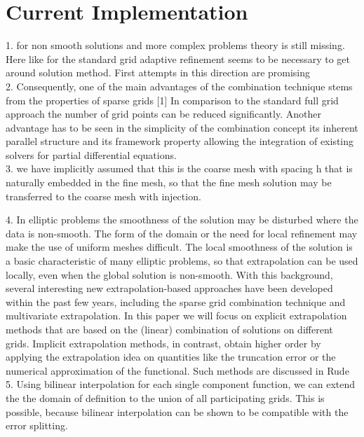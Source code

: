 \chapter{Current Implementation}
\label{chapter:myImplementation}

1. for non smooth solutions and more complex problems theory is still missing. Here like for the standard grid adaptive refinement seems to be necessary to get around solution method. First attempts in this direction are promising\cite{Griebel1992b} \\

2. Consequently, one of the main advantages of the combination technique stems from the properties of sparse grids [1] In comparison to the standard full grid approach the number of grid points can be reduced significantly. Another advantage has to be seen in the simplicity of the combination concept its inherent parallel structure and its framework property allowing the integration of existing solvers for partial differential equations.\cite{Bungartz1994}\\ %

3. we have implicitly assumed that this is the coarse mesh with spacing h that is naturally embedded in the fine mesh, so that the fine mesh solution may be transferred to the coarse mesh with injection.

4. In elliptic problems the smoothness of the solution may be disturbed where the data is non-smooth. The form of the domain or the need for local refinement may make the use of uniform meshes difficult.  The local smoothness of the solution is a basic characteristic of many elliptic problems, so that extrapolation can be used locally, even when the global solution is non-smooth. With this background, several interesting new extrapolation-based approaches have been developed within the past few years, including the sparse grid combination technique and multivariate extrapolation. In this paper we will focus on explicit extrapolation methods that are based on the (linear) combination of solutions on different grids. Implicit extrapolation methods, in contrast, obtain higher order by applying the extrapolation idea on quantities like the truncation error or the numerical approximation of the functional. Such methods are discussed in Rude\cite{Rude1994, Rude92extrapolationand} \\

5. Using bilinear interpolation for each single component function, we can extend the the domain of definition to the union of all participating grids. This is possible, because bilinear interpolation can be shown to be compatible with the error splitting.\cite{Rude1994} \\


